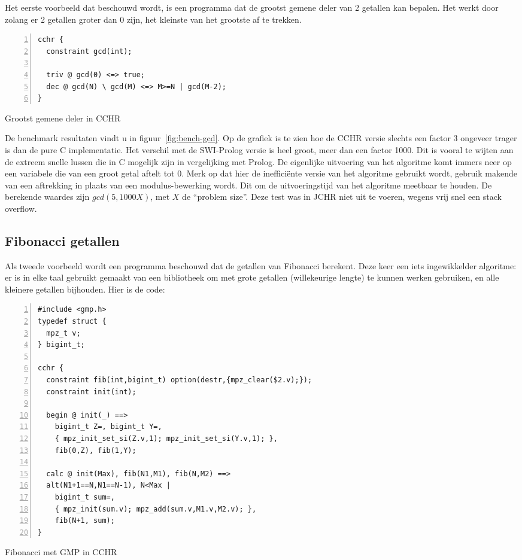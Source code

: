 Het eerste voorbeeld dat beschouwd wordt, is een programma dat de grootst gemene deler van 2 getallen kan bepalen. Het werkt door zolang er 2 getallen groter dan 0 zijn, het kleinste van het grootste af te trekken. 
\begin{exCode}
\begin{Verbatim}[frame=single,numbers=left]
cchr {
  constraint gcd(int);

  triv @ gcd(0) <=> true;
  dec @ gcd(N) \ gcd(M) <=> M>=N | gcd(M-2);
}
\end{Verbatim}
\caption{\label{code:fib} Grootst gemene deler in CCHR}
\end{exCode}
De benchmark resultaten vindt u in figuur~\ref{fig:bench-gcd}. Op de grafiek is te zien hoe de CCHR versie slechts een factor 3 ongeveer trager is dan de pure C implementatie. Het verschil met de SWI-Prolog versie is heel groot, meer dan een factor 1000. Dit is vooral te wijten aan de extreem snelle lussen die in C mogelijk zijn in vergelijking met Prolog. De eigenlijke uitvoering van het algoritme komt immers neer op een variabele die van een groot getal aftelt tot 0. Merk op dat hier de ineffici\"ente versie van het algoritme gebruikt wordt, gebruik makende van een aftrekking in plaats van een modulus-bewerking wordt. Dit om de uitvoeringstijd van het algoritme meetbaar te houden. De berekende waardes zijn $gcd(5,1000 X)$, met $X$ de ``problem size''. Deze test was in JCHR niet uit te voeren, wegens vrij snel een stack overflow.

\subsection{Fibonacci getallen} \label{sec:bench-fib}

Als tweede voorbeeld wordt een programma beschouwd dat de getallen van Fibonacci berekent. Deze keer een iets ingewikkelder algoritme: er is in elke taal gebruikt gemaakt van een bibliotheek om met grote getallen (willekeurige lengte) te kunnen werken gebruiken, en alle kleinere getallen bijhouden. Hier is de code:
\begin{exCode}
\begin{Verbatim}[frame=single,numbers=left]
#include <gmp.h>
typedef struct {
  mpz_t v;
} bigint_t;

cchr {
  constraint fib(int,bigint_t) option(destr,{mpz_clear($2.v);});
  constraint init(int);
  
  begin @ init(_) ==> 
    bigint_t Z=, bigint_t Y=, 
    { mpz_init_set_si(Z.v,1); mpz_init_set_si(Y.v,1); },
    fib(0,Z), fib(1,Y);

  calc @ init(Max), fib(N1,M1), fib(N,M2) ==>
  alt(N1+1==N,N1==N-1), N<Max |
    bigint_t sum=,
    { mpz_init(sum.v); mpz_add(sum.v,M1.v,M2.v); },
    fib(N+1, sum);
}
\end{Verbatim}
\caption{\label{code:fibgmp} Fibonacci met GMP in CCHR}
\end{exCode}

